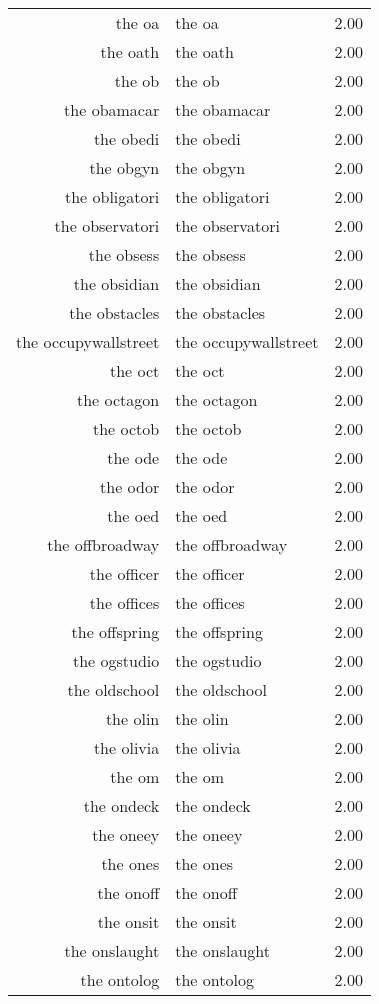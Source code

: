 \begin{table}[ht]
\begin{tabular}{rlr}
  the oa & the oa & 2.00 \\ 
  the oath & the oath & 2.00 \\ 
  the ob & the ob & 2.00 \\ 
  the obamacar & the obamacar & 2.00 \\ 
  the obedi & the obedi & 2.00 \\ 
  the obgyn & the obgyn & 2.00 \\ 
  the obligatori & the obligatori & 2.00 \\ 
  the observatori & the observatori & 2.00 \\ 
  the obsess & the obsess & 2.00 \\ 
  the obsidian & the obsidian & 2.00 \\ 
  the obstacles & the obstacles & 2.00 \\ 
  the occupywallstreet & the occupywallstreet & 2.00 \\ 
  the oct & the oct & 2.00 \\ 
  the octagon & the octagon & 2.00 \\ 
  the octob & the octob & 2.00 \\ 
  the ode & the ode & 2.00 \\ 
  the odor & the odor & 2.00 \\ 
  the oed & the oed & 2.00 \\ 
  the offbroadway & the offbroadway & 2.00 \\ 
  the officer & the officer & 2.00 \\ 
  the offices & the offices & 2.00 \\ 
  the offspring & the offspring & 2.00 \\ 
  the ogstudio & the ogstudio & 2.00 \\ 
  the oldschool & the oldschool & 2.00 \\ 
  the olin & the olin & 2.00 \\ 
  the olivia & the olivia & 2.00 \\ 
  the om & the om & 2.00 \\ 
  the ondeck & the ondeck & 2.00 \\ 
  the oneey & the oneey & 2.00 \\ 
  the ones & the ones & 2.00 \\ 
  the onoff & the onoff & 2.00 \\ 
  the onsit & the onsit & 2.00 \\ 
  the onslaught & the onslaught & 2.00 \\ 
  the ontolog & the ontolog & 2.00 \\ 

\end{tabular}
\end{table}

